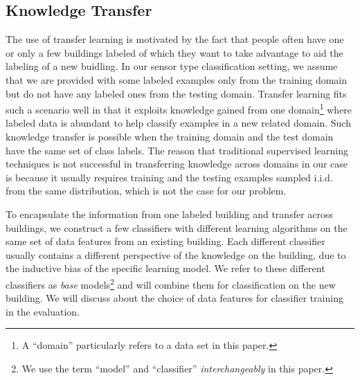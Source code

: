 \subsection{Knowledge Transfer}
The use of transfer learning is motivated by the fact that people often have one or only a few buildings labeled of which they want to take advantage to aid the labeling of a new buidling.
In our sensor type classification setting, we assume that we are provided with some labeled examples only from the training domain but do not have any labeled ones from the testing domain. 
Transfer learning fits such a scenario well in that it exploits knowledge gained from one domain\footnote{A ``domain'' particularly refers to a data set  in this paper.} where labeled data is abundant to help classify examples in a new related domain. 
Such knowledge transfer is possible when the training domain and the test domain have the same set of class labels. 
The reason that traditional supervised learning techniques is not successful in transferring knowledge across domains in our case is because it usually requires training and the testing examples sampled i.i.d. from the same distribution, which is not the case for our problem.

To encapsulate the information from one labeled building and transfer across buildings, we construct a few classifiers with different learning algorithms on the same set of data features from an existing building. 
Each different classifier usually contains a different perspective of the knowledge on the building, due to the inductive bias of the specific learning model. 
We refer to these different classifiers as {\it base} models\footnote{We use the term ``model'' and ``classifier'' {\it interchangeably} in this paper.} and will combine them for classification on the new building.
We will discuss about the choice of data features for classifier training in the evaluation.


